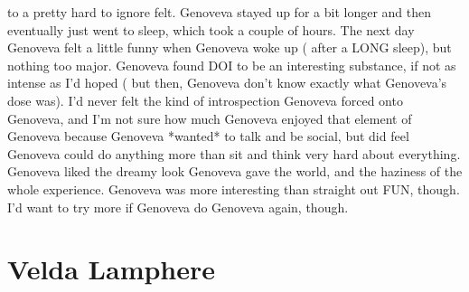 \documentclass[12pt]{book}
\begin{document}
to a pretty hard to ignore felt. Genoveva stayed up for a bit longer and then eventually just went to sleep, which took a couple of hours. The next day Genoveva felt a little funny when Genoveva woke up ( after a LONG sleep), but nothing too major. Genoveva found DOI to be an interesting substance, if not as intense as I'd hoped ( but then, Genoveva don't know exactly what Genoveva's dose was). I'd never felt the kind of introspection Genoveva forced onto Genoveva, and I'm not sure how much Genoveva enjoyed that element of Genoveva because Genoveva *wanted* to talk and be social, but did feel Genoveva could do anything more than sit and think very hard about everything. Genoveva liked the dreamy look Genoveva gave the world, and the haziness of the whole experience. Genoveva was more interesting than straight out FUN, though. I'd want to try more if Genoveva do Genoveva again, though.



\chapter{Velda Lamphere}
\end{document}
